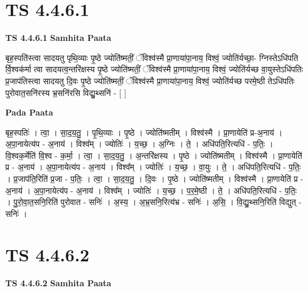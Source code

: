 \documentclass[17pt]{extarticle}
\begin{document}
\section*{ TS 4.4.6.1 }

\textbf{TS 4.4.6.1 } \newline
\textbf{Samhita Paata} \newline

बृह॒स्पति॑स्त्वा सादयतु पृथि॒व्याः पृ॒ष्ठे ज्योति॑ष्मतीं॒ ॅविश्व॑स्मै प्रा॒णाया॑पा॒नाय॒ विश्वं॒ ज्योति॑र्यच्छा॒- ग्निस्तेऽधि॑पति र्वि॒श्वक॑र्मा त्वा सादयत्व॒न्तरि॑क्षस्य पृ॒ष्ठे ज्योति॑ष्मतीं॒ ॅविश्व॑स्मै प्रा॒णाया॑पा॒नाय॒ विश्वं॒ ज्योति॑र्यच्छ वा॒युस्तेऽधि॑पतिः प्र॒जाप॑तिस्त्वा सादयतु दि॒वः पृ॒ष्ठे ज्योति॑ष्मतीं॒ ॅविश्व॑स्मै प्रा॒णाया॑पा॒नाय॒ विश्वं॒ ज्योति॑र्यच्छ परमे॒ष्ठी तेऽधि॑पतिः पुरोवात॒सनि॑रस्य भ्र॒सनि॑रसि विद्यु॒थ्सनि॑ - [  ] \newline

\textbf{Pada Paata} \newline

बृह॒स्पतिः॑ । त्वा॒ । सा॒द॒य॒तु॒ । पृ॒थि॒व्याः । पृ॒ष्ठे । ज्योति॑ष्मतीम् । विश्व॑स्मै । प्रा॒णायेति॑ प्र-अ॒नाय॑ । अ॒पा॒नायेत्य॑प - अ॒नाय॑ । विश्व᳚म् । ज्योतिः॑ । य॒च्छ॒ । अ॒ग्निः । ते॒ । अधि॑पति॒रित्यधि॑ - प॒तिः॒ । वि॒श्वक॒र्मेति॑ वि॒श्व - क॒र्मा॒ । त्वा॒ । सा॒द॒य॒तु॒ । अ॒न्तरि॑क्षस्य । पृ॒ष्ठे । ज्योति॑ष्मतीम् । विश्व॑स्मै । प्रा॒णायेति॑ प्र - अ॒नाय॑ । अ॒पा॒नायेत्य॑प - अ॒नाय॑ । विश्व᳚म् । ज्योतिः॑ । य॒च्छ॒ । वा॒युः । ते॒ । अधि॑पति॒रित्यधि॑ - प॒तिः॒ । प्र॒जाप॑ति॒रिति॑ प्र॒जा - प॒तिः॒ । त्वा॒ । सा॒द॒य॒तु॒ । दि॒वः । पृ॒ष्ठे । ज्योति॑ष्मतीम् । विश्व॑स्मै । प्रा॒णायेति॑ प्र - अ॒नाय॑ । अ॒पा॒नायेत्य॑प - अ॒नाय॑ । विश्व᳚म् । ज्योतिः॑ । य॒च्छ॒ । प॒र॒मे॒ष्ठी । ते॒ । अधि॑पति॒रित्यधि॑ - प॒तिः॒ । पु॒रो॒वा॒त॒सनि॒रिति॑ पुरोवात - सनिः॑ । अ॒स्य॒ । अ॒भ्र॒सनि॒रित्य॑भ्र - सनिः॑ । अ॒सि॒ । वि॒द्यु॒थ्सनि॒रिति॑ विद्युत् - सनिः॑ ।  \newline




\section*{ TS 4.4.6.2 }

\textbf{TS 4.4.6.2 } \newline
\textbf{Samhita Paata} \newline
\end{document}
